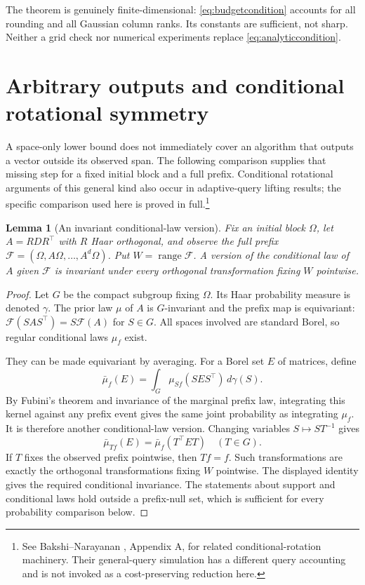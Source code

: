 \documentclass[11pt]{article}
\newtheorem{lemma}[theorem]{Lemma}
\theoremstyle{definition}
\newcommand{\ran}{\operatorname{range}}
\begin{document}
The theorem is genuinely finite-dimensional: \eqref{eq:budgetcondition} accounts for all rounding and all Gaussian column ranks. Its constants are sufficient, not sharp. Neither a grid check nor numerical experiments replace \eqref{eq:analyticcondition}.

\section{Arbitrary outputs and conditional rotational symmetry}\label{sec:rotation}
A space-only lower bound does not immediately cover an algorithm that outputs a vector outside its observed span. The following comparison supplies that missing step for a fixed initial block and a full prefix. Conditional rotational arguments of this general kind also occur in adaptive-query lifting results; the specific comparison used here is proved in full.\footnote{See Bakshi--Narayanan \cite{bn}, Appendix A, for related conditional-rotation machinery. Their general-query simulation has a different query accounting and is not invoked as a cost-preserving reduction here.}

\begin{lemma}[An invariant conditional-law version]\label{lem:conditioning}
Fix an initial block $\Omega$, let $A=RDR^\top$ with $R$ Haar orthogonal, and observe the full prefix $\mathcal F=(\Omega,A\Omega,\ldots,A^d\Omega)$. Put $W=\ran\mathcal F$. A version of the conditional law of $A$ given $\mathcal F$ is invariant under every orthogonal transformation fixing $W$ pointwise.
\end{lemma}
\begin{proof}
Let $G$ be the compact subgroup fixing $\Omega$. Its Haar probability measure is denoted $\gamma$. The prior law $\mu$ of $A$ is $G$-invariant and the prefix map is equivariant: $\mathcal F(SAS^\top)=S\mathcal F(A)$ for $S\in G$. All spaces involved are standard Borel, so regular conditional laws $\mu_f$ exist.

They can be made equivariant by averaging. For a Borel set $E$ of matrices, define
\[
\bar\mu_f(E)=\int_G\mu_{Sf}(SES^\top)\,d\gamma(S).
\]
By Fubini's theorem and invariance of the marginal prefix law, integrating this kernel against any prefix event gives the same joint probability as integrating $\mu_f$. It is therefore another conditional-law version. Changing variables $S\mapsto ST^{-1}$ gives
\[
\bar\mu_{Tf}(E)=\bar\mu_f(T^\top ET)
\quad(T\in G).
\]
If $T$ fixes the observed prefix pointwise, then $Tf=f$. Such transformations are exactly the orthogonal transformations fixing $W$ pointwise. The displayed identity gives the required conditional invariance. The statements about support and conditional laws hold outside a prefix-null set, which is sufficient for every probability comparison below.
\end{proof}
\end{document}
